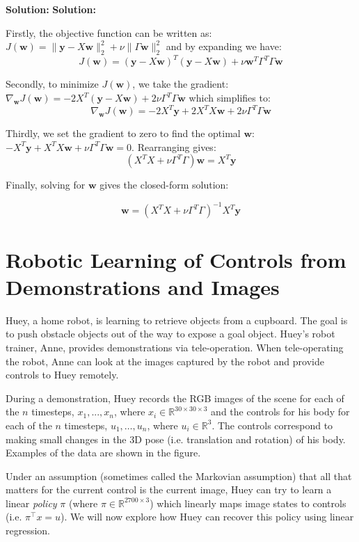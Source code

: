 \documentclass{article}
\newcommand{\Question}[1]{\Large \section{ #1 } \normalsize}
\newenvironment{solution}{\color{blue} \smallskip \textbf{Solution:}}{}
\begin{document}
\begin{enumerate}
    \begin{solution}
\textbf{Solution:}

Firstly, the objective function can be written as:
\(
J(\mathbf{w}) = \|\mathbf{y} - X \mathbf{w} \|_2^2 + \nu \|\Gamma \mathbf{w} \|_2^2
\) and by expanding we have:
\[
J(\mathbf{w}) = (\mathbf{y} - X \mathbf{w})^T (\mathbf{y} - X \mathbf{w}) + \nu \mathbf{w}^T \Gamma^T \Gamma \mathbf{w}
\]

Secondly, to minimize \( J(\mathbf{w}) \), we take the gradient:
\(
\nabla_{\mathbf{w}} J(\mathbf{w}) = -2 X^T (\mathbf{y} - X \mathbf{w}) + 2 \nu \Gamma^T \Gamma \mathbf{w}
\) which simplifies to:
\[
\nabla_{\mathbf{w}} J(\mathbf{w}) = -2 X^T \mathbf{y} + 2 X^T X \mathbf{w} + 2 \nu \Gamma^T \Gamma \mathbf{w}
\]

Thirdly, we set the gradient to zero to find the optimal \( \mathbf{w} \):
\(
- X^T \mathbf{y} + X^T X \mathbf{w} + \nu \Gamma^T \Gamma \mathbf{w} = 0
\). Rearranging gives:
\[
(X^T X + \nu \Gamma^T \Gamma) \mathbf{w} = X^T \mathbf{y}
\]

Finally, solving for \( \mathbf{w} \) gives the closed-form solution:

\[
\mathbf{w} = (X^T X + \nu \Gamma^T \Gamma)^{-1} X^T \mathbf{y}
\]

    \end{solution}

\end{enumerate}

\newpage
\Question{Robotic Learning of Controls from Demonstrations and Images}

Huey, a home robot, is learning to retrieve objects from a cupboard. The goal is to push obstacle objects out of the way to expose a goal object.  Huey's robot trainer, Anne, provides demonstrations via tele-operation. When tele-operating the robot, Anne can look at the images captured by the robot and provide controls to Huey remotely.

During a demonstration, Huey records the RGB images of the scene for each of the $n$ timesteps, $x_1,...,x_{n}$, where $x_i \in \mathbb{R}^{30\times 30\times 3}$ and the controls for his body for each of the $n$ timesteps, $u_1,\ldots,u_{n}$, where $u_i \in \mathbb{R}^3$. The controls correspond to making small changes in the 3D pose (i.e. translation and rotation) of his body. Examples of the data are shown in the figure. 

Under an assumption (sometimes called the Markovian assumption) that all that matters for the current control is the current image, Huey can try to learn a linear \emph{policy} $\pi$ (where $\pi \in \mathbb{R}^{2700\times 3}$) which linearly maps image states to controls (i.e. $\pi^\top x =u$). We will now explore how Huey can recover this policy using linear regression. 
\end{document}
